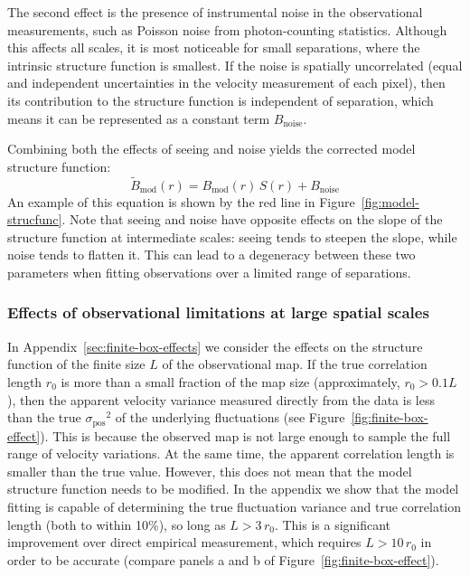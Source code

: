\documentclass[fleqn,usenatbib, useAMS, a4paper]{mnras}
\newcommand\pos{\ensuremath{_{\mathrm{pos}}}}
\newcommand\noise{\ensuremath{_{\text{noise}}}}
\newcommand\model{\ensuremath{_{\mathrm{mod}}}}
\begin{document}
The second effect is the presence of instrumental noise
in the observational measurements,
such as Poisson noise from photon-counting statistics. 
Although this affects all scales,
it is most noticeable for small separations,
where the intrinsic structure function is smallest.
If the noise is spatially uncorrelated
(equal and independent uncertainties in the velocity
measurement of each pixel),
then its contribution to the structure function is independent of separation,
which means it can be represented as a constant term \(B\noise\).

Combining both the effects of seeing and noise yields the corrected
model structure function:
\begin{equation}
  \tilde{B}\model(r) = B\model(r) \,  S(r) + B\noise
  \label{eq:sf-functional}
\end{equation}
An example of this equation is shown by the red line in Figure~\ref{fig:model-strucfunc}.
Note that seeing and noise have opposite effects on the slope
of the structure function at intermediate scales:
seeing tends to steepen the slope, while noise tends to flatten it.
This can lead to a degeneracy between these two parameters
when fitting observations over a limited range of separations.

\subsubsection{Effects of observational limitations at large spatial scales}
\label{sec:effects-observ-limit-large}

In Appendix~\ref{sec:finite-box-effects} we consider the effects
on the structure function of the finite size \(L\) of the observational map.
If the true correlation length \(r_0\) is more than a small fraction of the map size
(approximately, \(r_0 > 0.1 L\)),
then the apparent velocity variance measured directly from the data
is less than the true \({\sigma\pos}^2\) of the underlying fluctuations
(see Figure~\ref{fig:finite-box-effect}).
This is because the observed map is not large enough to sample
the full range of velocity variations.
At the same time, the apparent correlation length is smaller
than the true value.
However, this does not mean that the model structure function needs to be modified.
In the appendix we show that the model fitting is capable of determining the true fluctuation variance
and true correlation length (both to within 10\%),
so long as \(L > 3\, r_0\).
This is a significant improvement over direct empirical measurement,
which requires \(L > 10\, r_0\) in order to be accurate
(compare panels a and b of Figure~\ref{fig:finite-box-effect}).
\end{document}
